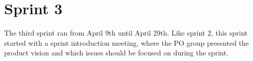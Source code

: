\chapter{Sprint 3}
The third sprint ran from April 9th until April 29th. Like sprint 2, this sprint started with a sprint introduction meeting, where the PO group presented the product vision and which issues should be focused on during the sprint. 

